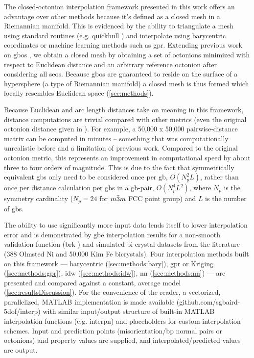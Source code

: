 \documentclass[preprint,12pt]{elsarticle}
\begin{document}
The closed-octonion interpolation framework presented in this work offers an advantage over other methods because it's defined as a closed mesh in a Riemannian manifold. This is evidenced by the ability to triangulate a mesh using standard routines (e.g. quickhull \cite{barberQuickhullAlgorithmConvex1996}) and interpolate using barycentric coordinates or machine learning methods such as \gls{gpr}. Extending previous work on \glspl{gbo} \cite{francisGeodesicOctonionMetric2019,chesserLearningGrainBoundary2020}, we obtain a closed mesh by obtaining a set of octonions minimized with respect to Euclidean distance and an arbitrary reference octonion after considering all \glspl{seo}. Because \glspl{gbo} are guaranteed to reside on the surface of a hypersphere \cite{francisGeodesicOctonionMetric2019} (a type of Riemannian manifold) a closed mesh is thus formed which locally resembles Euclidean space (\ref{sec:methods}).

Because Euclidean and arc length distances take on meaning in this framework, distance computations are trivial compared with other metrics (even the original octonion distance given in \cite{francisGeodesicOctonionMetric2019}). For example, a 50,000 x 50,000 pairwise-distance matrix can be computed in minutes -- something that was computationally unrealistic before and a limitation of previous work. Compared to the original octonion metric, this represents an improvement in computational speed by about three to four orders of magnitude. This is due to the fact that symmetrically equivalent \glspl{gb} only need to be considered once per \gls{gb}, $O(N_p^2L)$, rather than once per distance calculation per \glspl{gb} in a \gls{gb}-pair, $O(N_p^4L^2)$, where $N_p$ is the symmetry cardinality ($N_p=24$ for $m\Bar{3}m$ FCC point group) and $L$ is the number of \glspl{gb}. %

The ability to use significantly more input data lends itself to lower interpolation error and is demonstrated by \gls{gbe} interpolation results for a non-smooth validation function (\gls{brk} \cite{bulatovGrainBoundaryEnergy2014}) and simulated bi-crystal datasets from the literature (388 Olmsted Ni \cite{olmstedSurveyComputedGrain2009} and 50,000 Kim Fe \cite{kimIdentificationSchemeGrain2011} bicrystals). Four interpolation methods built on this framework --- barycentric (\ref{sec:methods:bary}), \gls{gpr} or Kriging (\ref{sec:methods:gpr}), \gls{idw} (\ref{sec:methods:idw}), \gls{nn} (\ref{sec:methods:nn}) --- are presented and compared against a constant, average model (\ref{sec:resultsDiscussion}). For the convenience of the reader, a vectorized, parallelized, MATLAB implementation is made available (github.com/sgbaird-5dof/interp) with similar input/output structure of built-in MATLAB interpolation functions (e.g. interpn) and placeholders for custom interpolation schemes. Input and prediction points (misorientation/\gls{bp} normal pairs or octonions) and property values are supplied, and interpolated/predicted values are output.
\end{document}
